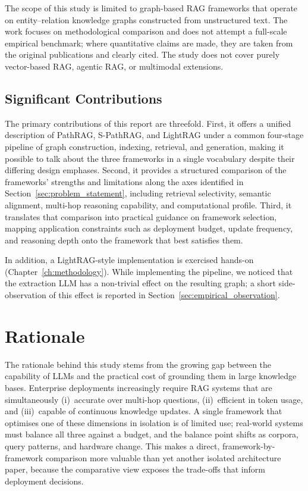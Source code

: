 \documentclass[12pt,a4paper,oneside]{report}
\begin{document}
The scope of this study is limited to graph-based RAG frameworks that operate
on entity--relation knowledge graphs constructed from unstructured text. The
work focuses on methodological comparison and does not attempt a full-scale
empirical benchmark; where quantitative claims are made, they are taken from
the original publications and clearly cited. The study does not cover purely
vector-based RAG, agentic RAG, or multimodal extensions.

\section{Significant Contributions}

The primary contributions of this report are threefold. First, it offers
a unified description of PathRAG, S-PathRAG, and LightRAG under a common
four-stage pipeline of graph construction, indexing, retrieval, and
generation, making it possible to talk about the three frameworks in a
single vocabulary despite their differing design emphases. Second, it
provides a structured comparison of the frameworks' strengths and
limitations along the axes identified in
Section~\ref{sec:problem_statement}, including retrieval selectivity,
semantic alignment, multi-hop reasoning capability, and computational
profile. Third, it translates that comparison into practical guidance
on framework selection, mapping application constraints such as
deployment budget, update frequency, and reasoning depth onto the
framework that best satisfies them.

In addition, a LightRAG-style implementation is exercised hands-on
(Chapter~\ref{ch:methodology}). While implementing the pipeline, we
noticed that the extraction LLM has a non-trivial effect on the
resulting graph; a short side-observation of this effect is reported in
Section~\ref{sec:empirical_observation}.

\chapter{Rationale}
\label{ch:rationale}

The rationale behind this study stems from the growing gap between the
capability of LLMs and the practical cost of grounding them in large
knowledge bases. Enterprise deployments increasingly require RAG systems
that are simultaneously (i)~accurate over multi-hop questions, (ii)~efficient
in token usage, and (iii)~capable of continuous knowledge updates. A
single framework that optimises one of these dimensions in isolation is
of limited use; real-world systems must balance all three against a
budget, and the balance point shifts as corpora, query patterns, and
hardware change. This makes a direct, framework-by-framework comparison
more valuable than yet another isolated architecture paper, because the
comparative view exposes the trade-offs that inform deployment decisions.
\end{document}
